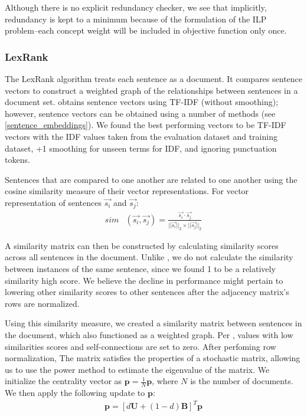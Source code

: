 Although there is no explicit redundancy checker, we see that implicitly, redundancy is kept to a minimum because of the formulation of the ILP problem--each concept weight will be included in objective function only once.

\subsubsection{LexRank}

The LexRank algorithm treats each sentence as a document. It compares sentence vectors to construct a weighted graph of the relationships between sentences in a document set. \citet{lexrank} obtains sentence vectors using TF-IDF (without smoothing); however, sentence vectors can be obtained using a number of methods (see \ref{sentence_embeddings}). We found the best performing vectors to be TF-IDF vectors with the IDF values taken from the evaluation dataset and training dataset, +1 smoothing for unseen terms for IDF, and ignoring punctuation tokens.

Sentences that are compared to one another are related to one another using the cosine similarity measure of their vector representations. For vector representation of sentences $\Vec{s_i}$ and $\Vec{s_j}$: 
\begin{align} 
    sim&(\Vec{s_i},\Vec{s_j}) = \frac{\Vec{s_i} \cdot \Vec{s_j}}{||\Vec{s_i}||_2 \times ||\Vec{s_j}||_2} \label{cosine similarity measure}
\end{align} \normalsize

\noindent A similarity matrix can then be constructed by calculating similarity scores across all sentences in the document. Unlike \citet{lexrank}, we do not calculate the similarity between instances of the same sentence, since we found 1 to be a relatively similarity high score. We believe the decline in performance might pertain to lowering other similarity scores to other sentences after the adjacency matrix's rows are normalized.

Using this similarity measure, we created a similarity matrix between sentences in the document, which also functioned as a weighted graph. Per \citet{lexrank}, values with low similarities scores and self-connections are set to zero. After perfoming row normalization, The matrix satisfies the properties of a stochastic matrix, allowing us to use the power method to estimate the eigenvalue of the matrix. We initialize the centrality vector as $\bm{p}=\frac{1}{N}\bm{p}$, where $N$ is the number of documents. We then apply the following update to  $\bm{p}$: \begin{align} 
    \bm{p} = [d\bm{U}+(1-d)\bm{B}]^T\bm{p}
\end{align}

